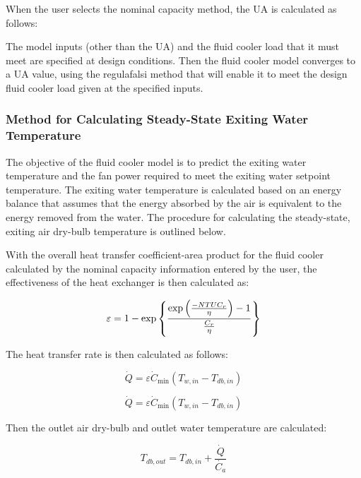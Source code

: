 When the user selects the nominal capacity method, the UA is calculated as follows:

The model inputs (other than the UA) and the fluid cooler load that it must meet are specified at design conditions. Then the fluid cooler model converges to a UA value, using the regulafalsi method that will enable it to meet the design fluid cooler load given at the specified inputs.

\subsubsection{Method for Calculating Steady-State Exiting Water Temperature}\label{method-for-calculating-steady-state-exiting-water-temperature-1}

The objective of the fluid cooler model is to predict the exiting water temperature and the fan power required to meet the exiting water setpoint temperature. The exiting water temperature is calculated based on an energy balance that assumes that the energy absorbed by the air is equivalent to the energy removed from the water. The procedure for calculating the steady-state, exiting air dry-bulb temperature is outlined below.

With the overall heat transfer coefficient-area product for the fluid cooler calculated by the nominal capacity information entered by the user, the effectiveness of the heat exchanger is then calculated as:

\begin{equation}
  \varepsilon = 1-\exp{\left\{ \frac{\exp{\left(\frac{-NTU C_r}{\eta}\right)}-1}{\frac{C_{r}}{\eta}} \right\}}
\end{equation}

The heat transfer rate is then calculated as follows:

\begin{equation}
\dot Q = \varepsilon {\dot C_{\min }}({T_{w,in}} - {T_{db,in}})
\end{equation}

\begin{equation}
\dot Q = \varepsilon {\dot C_{\min }}({T_{w,in}} - {T_{db,in}})
\end{equation}

Then the outlet air dry-bulb and outlet water temperature are calculated:

\begin{equation}
{T_{db,out}} = {T_{db,in}} + \frac{\dot{Q}}{\dot{C_a}}
\end{equation}

